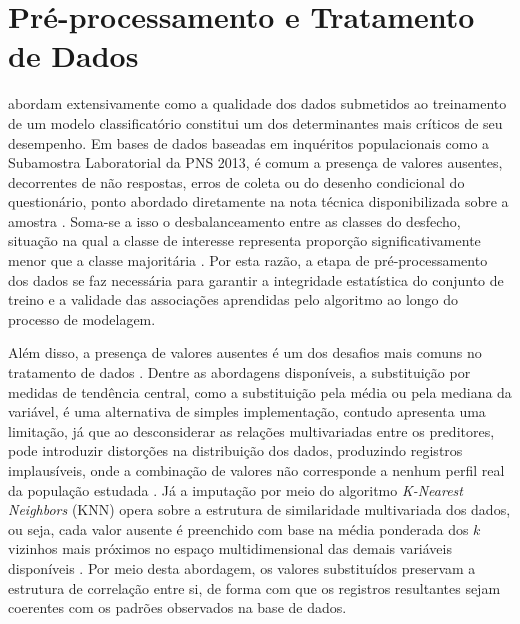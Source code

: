 \section{Pré-processamento e Tratamento de Dados} \label{sec:pre-processamento}

\textcite{hastie2009elements} abordam extensivamente como a qualidade dos dados submetidos ao treinamento de um modelo classificatório constitui um dos determinantes mais críticos de seu desempenho. Em bases de dados baseadas em inquéritos populacionais como a Subamostra Laboratorial da PNS 2013, é comum a presença de valores ausentes, decorrentes de não respostas, erros de coleta ou do desenho condicional do questionário, ponto abordado diretamente na nota técnica disponibilizada sobre a amostra \cite{IBGE}. Soma-se a isso o desbalanceamento entre as classes do desfecho, situação na qual a classe de interesse representa proporção significativamente menor que a classe majoritária \cite{pertiwi2020comparison}. Por esta razão, a etapa de pré-processamento dos dados se faz necessária para garantir a integridade estatística do conjunto de treino e a validade das associações aprendidas pelo algoritmo ao longo do processo de modelagem.

Além disso, a presença de valores ausentes é um dos desafios mais comuns no tratamento de dados \cite{hastie2009elements}. Dentre as abordagens disponíveis, a substituição por medidas de tendência central, como a substituição pela média ou pela mediana da variável, é uma alternativa de simples implementação, contudo apresenta uma limitação, já que ao desconsiderar as relações multivariadas entre os preditores, pode introduzir distorções na distribuição dos dados, produzindo registros implausíveis, onde a combinação de valores não corresponde a nenhum perfil real da população estudada \cite{hastie2009elements}. Já a imputação por meio do algoritmo \textit{K-Nearest Neighbors} (KNN) opera sobre a estrutura de similaridade multivariada dos dados, ou seja, cada valor ausente é preenchido com base na média ponderada dos $k$ vizinhos mais próximos no espaço multidimensional das demais variáveis disponíveis \cite{pedregosa2011scikit, pertiwi2020comparison}. Por meio desta abordagem, os valores substituídos preservam a estrutura de correlação entre si, de forma com que os registros resultantes sejam coerentes com os padrões observados na base de dados.

